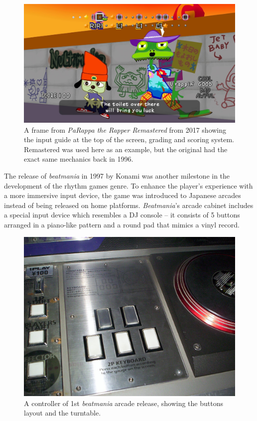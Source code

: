 \begin{figure}[h]
    \centering\includegraphics[scale=0.15]{obrazki/parappatherapper.jpg}
    \caption{A frame from \textit{PaRappa the Rapper Remastered} from 2017 showing the input guide at the top of the screen, grading and scoring system. Remastered was used here as an example, but the original had the exact same mechanics back in 1996. \cite{parappatherapper}}
    \label{fig:parappa_the_rapper}
\end{figure}

The release of \textit{beatmania} in 1997 by Konami was another milestone in the development of the rhythm games genre. To enhance the player’s experience with a more immersive input device, the game was introduced to Japanese arcades instead of being released on home platforms. \textit{Beatmania}’s arcade cabinet includes a special input device which resembles a DJ console -- it consists of 5 buttons arranged in a piano-like pattern and a round pad that mimics a vinyl record.

\begin{figure}[h]
    \centering\includegraphics[scale=0.15]{obrazki/beatmaniacontrols.jpg}
    \caption{A controller of 1st \textit{beatmania} arcade release, showing the buttons layout and the turntable. \cite{beatmaniacontrols}}
    \label{fig:beatmania_controls}
\end{figure}

